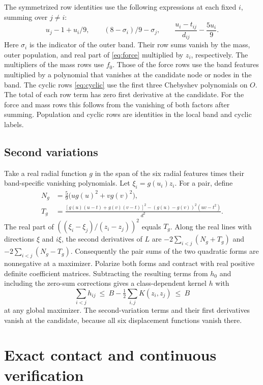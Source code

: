 \documentclass[11pt]{article}
\begin{document}
The symmetrized row identities use the following expressions at
each fixed \(i\), summing over \(j\ne i\):
\[
 u_j-1+u_i/9,\qquad
 (8-\sigma_i)/9-\sigma_j,\qquad
 \frac{u_i-t_{ij}}{d_{ij}}-\frac{5u_i}{9}.
\]
Here \(\sigma_i\) is the indicator of the outer band. Their row sums
vanish by the mass, outer population, and real part of
\eqref{eq:force} multiplied by \(z_i\), respectively. The
multipliers of the mass rows use \(f_0\). Those of the force rows
use the band features multiplied by a polynomial that vanishes at
the candidate node or nodes in the band. The cyclic rows
\eqref{eq:cyclic} use the first three Chebyshev polynomials on \(O\).
The total of each row term has zero first derivative at the candidate.
For the force and mass rows this follows from the vanishing of both
factors after summing. Population and cyclic rows are identities in the
local band and cyclic labels.

\subsection{Second variations}

Take a real radial function \(g\) in the span of the six radial
features times their band-specific vanishing polynomials. Let
\(\xi_i=g(u_i)z_i\). For a pair, define
\[
\begin{aligned}
 N_g &=\tfrac59\bigl(ug(u)^2+vg(v)^2\bigr),\\
 T_g &=\frac{[g(u)(u-t)+g(v)(v-t)]^2
                 -(g(u)-g(v))^2(uv-t^2)}{d^2}.
\end{aligned}
\]
The real part of \(((\xi_i-\xi_j)/(z_i-z_j))^2\) equals \(T_g\).
Along the real lines with directions \(\xi\) and \(i\xi\),
the second derivatives of \(L\) are
\(-2\sum_{i<j}(N_g+T_g)\) and \(-2\sum_{i<j}(N_g-T_g)\).
Consequently the pair sums of the two quadratic forms are
nonnegative at a maximizer. Polarize both forms and contract
with real positive definite coefficient matrices. Subtracting
the resulting terms from \(h_0\) and including the zero-sum
corrections gives a class-dependent kernel \(h\) with
\begin{equation}
 \sum_{i<j}h_{ij}\ \le\ B-\tfrac12\sum_{i,j}K(z_i,z_j)
 \ \le\ B                                                     \label{eq:budget}
\end{equation}
at any global maximizer. The second-variation terms and their
first derivatives vanish at the candidate, because all six
displacement functions vanish there.

\section{Exact contact and continuous verification}\label{sec:verify}
\end{document}
